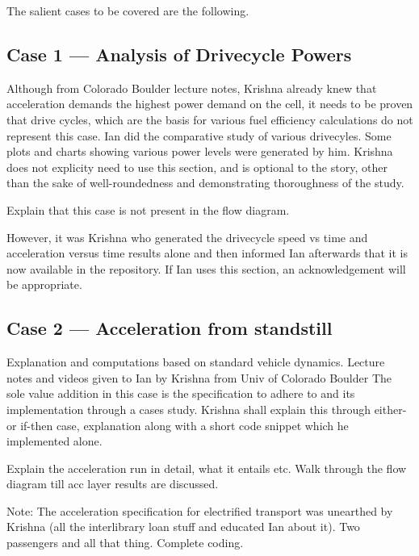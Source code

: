 
The salient cases to be covered are the following.

\subsection{Case 1 --- Analysis of Drivecycle Powers}

Although  from  Colorado  Boulder  lecture  notes,  Krishna  already  knew  that
acceleration demands the highest power demand on the cell, it needs to be proven
that drive cycles, which are the  basis for various fuel efficiency calculations
do not represent this case. Ian did the comparative study of various drivecyles.
Some  plots and  charts  showing various  power levels  were  generated by  him.
Krishna does  not explicity  need to use  this section, and  is optional  to the
story, other than the sake of well-roundedness and demonstrating thoroughness of
the study.

Explain that this case is not present in the flow diagram.

However,  it  was  Krishna  who  generated the  drivecycle  speed  vs  time  and
acceleration versus time results alone and  then informed Ian afterwards that it
is now available in the repository. If Ian uses this section, an acknowledgement
will be appropriate.


\subsection{Case 2 --- Acceleration from standstill}

Explanation and computations  based on standard vehicle  dynamics. Lecture notes
and videos given to Ian by Krishna  from Univ of Colorado Boulder The sole value
addition in this  case is the specification to adhere  to and its implementation
through  a cases  study. Krishna  shall explain  this through  either-or if-then
case, explanation along with a short code snippet which he implemented alone.

Explain the  acceleration run in detail,  what it entails etc.  Walk through the
flow diagram till acc layer results are discussed.

Note: The acceleration specification for  electrified transport was unearthed by
Krishna  (all the  interlibrary  loan  stuff and  educated  Ian  about it).  Two
passengers and all that thing. Complete coding.

